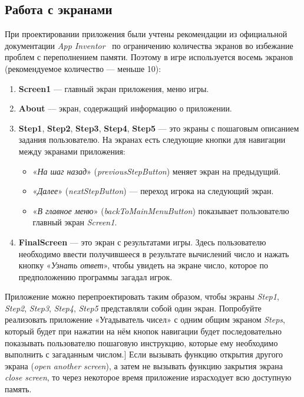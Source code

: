 \subsection{Работа с экранами}
При проектировании приложения были учтены рекомендации из официальной документации \textit{App Inventor}~\cite{MitManyScreens} по ограничению количества экранов во избежание проблем с переполнением памяти.
Поэтому в игре используется восемь экранов (рекомендуемое количество — меньше 10):
\begin{enumerate}
\item \textbf{Screen1} — главный экран приложения, меню игры.
\item \textbf{About} — экран, содержащий информацию о приложении.
\item \textbf{Step1}, \textbf{Step2}, \textbf{Step3}, \textbf{Step4}, \textbf{Step5} — это экраны с пошаговым описанием задания пользователю. На экранах есть следующие кнопки для навигации между экранами приложения:
\begin{itemize}
  \item «\textit{На шаг назад}» (\textit{previousStepButton}) меняет экран на предыдущий.
  \item «\textit{Далее}» (\textit{nextStepButton}) — переход игрока на следующий экран.
  \item «\textit{В главное меню}» (\textit{backToMainMenuButton}) показывает пользователю главный экран \textit{Screen1}.
\end{itemize}
\item \textbf{FinalScreen} — это экран с результатами игры. Здесь пользователю необходимо ввести получившееся в результате вычислений число и нажать кнопку «\textit{Узнать ответ}», чтобы увидеть на экране число, которое по предположению программы загадал игрок.
\end{enumerate}

\begin{mdfstyle}[nobreak=true,frametitle=Упражнение]
  \sloppy
  Приложение можно перепроектировать таким образом, чтобы экраны \textit{Step1}, \textit{Step2}, \textit{Step3}, \textit{Step4}, \textit{Step5} представляли собой один экран. Попробуйте реализовать приложение «Угадыватель чисел» с одним общим экраном \textit{Steps}, который будет при нажатии на нём кнопок навигации будет последовательно показывать пользователю пошаговую инструкцию, которые ему необходимо выполнить с загаданным числом.]
  Если вызывать функцию открытия другого экрана (\textit{open another screen}), а затем не вызывать функцию закрытия экрана \textit{close screen}, то через некоторое время приложение израсходует всю доступную память.
  \end{mdfstyle}

